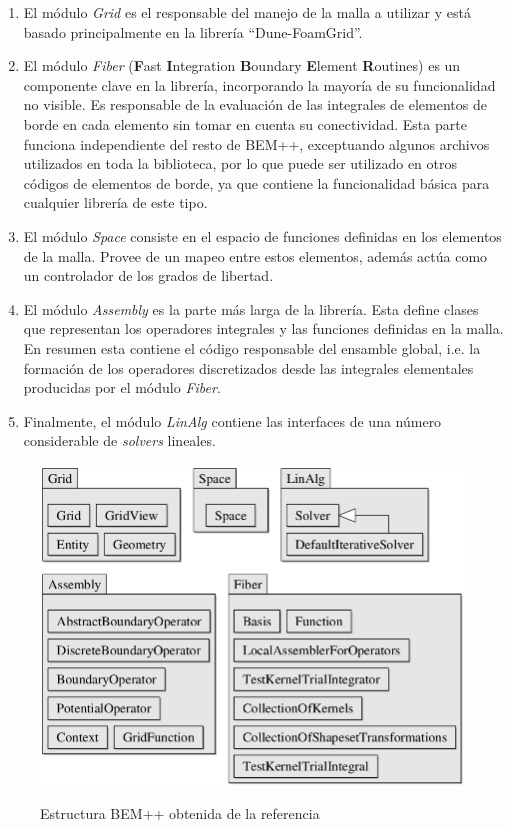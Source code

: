 \documentclass[12pt,letterpaper]{article}
\numberwithin{equation}{section}
\begin{document}
\begin{enumerate}
	\item El módulo \textit{Grid} es el responsable del manejo de la malla a utilizar y está basado principalmente en la librería ``Dune-FoamGrid''.
	\item El módulo \textit{Fiber} (\textbf{F}ast \textbf{I}ntegration \textbf{B}oundary \textbf{E}lement \textbf{R}outines) es un componente clave en la librería, incorporando la mayoría de su funcionalidad no visible. Es responsable de la evaluación de las integrales de elementos de borde en cada elemento sin tomar en cuenta su conectividad. Esta parte funciona independiente del resto de BEM++, exceptuando algunos archivos utilizados en toda la biblioteca, por lo que puede ser utilizado en otros códigos de elementos de borde, ya que contiene la funcionalidad básica para cualquier librería de este tipo.
	\item El módulo \textit{Space} consiste en el espacio de funciones definidas en los elementos de la malla. Provee de un mapeo entre estos elementos, además actúa como un controlador de los grados de libertad.
	\item El módulo \textit{Assembly} es la parte más larga de la librería. Esta define clases que representan los operadores integrales y las funciones definidas en la malla. En resumen esta contiene el código responsable del ensamble global, i.e. la formación de los operadores discretizados desde las integrales elementales producidas por el módulo \textit{Fiber}.
	\item Finalmente, el módulo \textit{LinAlg} contiene las interfaces de una número considerable de \textit{solvers} lineales.
\end{enumerate}

	
\begin{figure}[H]
	\centering\includegraphics[scale=0.4]{Imagenes/Partesbempp.png}\\
	\caption{Estructura BEM++ obtenida de la referencia \cite{paperBEMpp}}
	\label{fig:Partesbempp}
\end{figure} 
\end{document}
